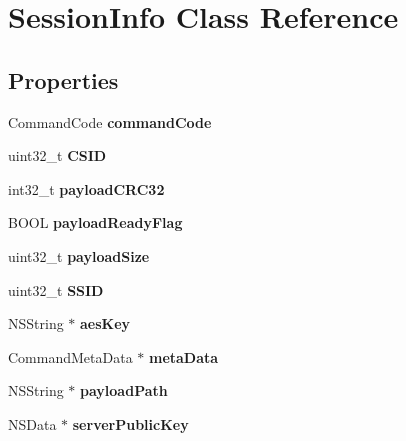 \hypertarget{interface_session_info}{
\section{SessionInfo Class Reference}
\label{interface_session_info}
}
\subsection*{Properties}
\begin{DoxyCompactItemize}
\item 
\hypertarget{interface_session_info_a1b8970b18b384e8bfe5f721420f33cf4}{
CommandCode {\bfseries commandCode}}
\label{interface_session_info_a1b8970b18b384e8bfe5f721420f33cf4}

\item 
\hypertarget{interface_session_info_aabb17e703dbf170ae47668b9d7db69e6}{
uint32\_\-t {\bfseries CSID}}
\label{interface_session_info_aabb17e703dbf170ae47668b9d7db69e6}

\item 
\hypertarget{interface_session_info_afb51db3d2609d9855ad8b821bf7aadce}{
int32\_\-t {\bfseries payloadCRC32}}
\label{interface_session_info_afb51db3d2609d9855ad8b821bf7aadce}

\item 
\hypertarget{interface_session_info_a51a6363a9f34f1c7f8b645f411c33ba5}{
BOOL {\bfseries payloadReadyFlag}}
\label{interface_session_info_a51a6363a9f34f1c7f8b645f411c33ba5}

\item 
\hypertarget{interface_session_info_ab2a638581e42015f46dff808a3ffe1d1}{
uint32\_\-t {\bfseries payloadSize}}
\label{interface_session_info_ab2a638581e42015f46dff808a3ffe1d1}

\item 
\hypertarget{interface_session_info_afa000308ef9225480778bae0aa916952}{
uint32\_\-t {\bfseries SSID}}
\label{interface_session_info_afa000308ef9225480778bae0aa916952}

\item 
\hypertarget{interface_session_info_a50dd82b35ed099e4401b87f77552d767}{
NSString $\ast$ {\bfseries aesKey}}
\label{interface_session_info_a50dd82b35ed099e4401b87f77552d767}

\item 
\hypertarget{interface_session_info_acfb2c576a94b99b56b005c89e13ba08a}{
CommandMetaData $\ast$ {\bfseries metaData}}
\label{interface_session_info_acfb2c576a94b99b56b005c89e13ba08a}

\item 
\hypertarget{interface_session_info_ab8a317ec602402c3642cde5f76a3bf97}{
NSString $\ast$ {\bfseries payloadPath}}
\label{interface_session_info_ab8a317ec602402c3642cde5f76a3bf97}

\item 
\hypertarget{interface_session_info_ac920b3bbe2d92af0b90e31f1f9fcacc5}{
NSData $\ast$ {\bfseries serverPublicKey}}
\label{interface_session_info_ac920b3bbe2d92af0b90e31f1f9fcacc5}

\end{DoxyCompactItemize}


